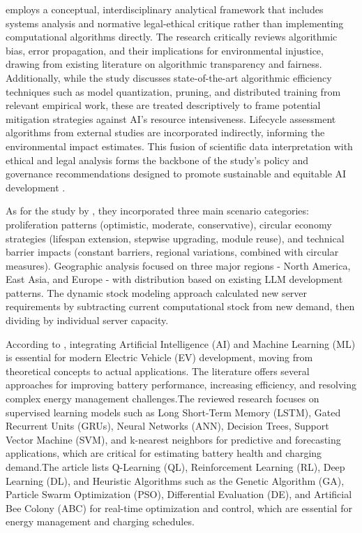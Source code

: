 \documentclass[a4paper, 12pt]{article}
\begin{document}
\par \citet{Zhuk2023} employs a conceptual, interdisciplinary analytical framework that includes systems analysis and normative legal-ethical critique rather than implementing computational algorithms directly. The research critically reviews algorithmic bias, error propagation, and their implications for environmental injustice, drawing from existing literature on algorithmic transparency and fairness. Additionally, while the study discusses state-of-the-art algorithmic efficiency techniques such as model quantization, pruning, and distributed training from relevant empirical work, these are treated descriptively to frame potential mitigation strategies against AI’s resource intensiveness. Lifecycle assessment algorithms from external studies are incorporated indirectly, informing the environmental impact estimates. This fusion of scientific data interpretation with ethical and legal analysis forms the backbone of the study’s policy and governance recommendations designed to promote sustainable and equitable AI development \citep[pp.~25--29]{Zhuk2023}. \hfill \break
\par As for the study by \cite{wang_2024_ewaste}, they incorporated three main scenario categories: proliferation patterns (optimistic, moderate, conservative), circular economy strategies (lifespan extension, stepwise upgrading, module reuse), and technical barrier impacts (constant barriers, regional variations, combined with circular measures). Geographic analysis focused on three major regions - North America, East Asia, and Europe - with distribution based on existing LLM development patterns. The dynamic stock modeling approach calculated new server requirements by subtracting current computational stock from new demand, then dividing by individual server capacity. \hfill \break
\par According to \citet{M.rauf2024}, integrating Artificial Intelligence (AI) and Machine Learning (ML) is essential for modern Electric Vehicle (EV) development, moving from theoretical concepts to actual applications.   The literature offers several approaches for improving battery performance, increasing efficiency, and resolving complex energy management challenges.The reviewed research focuses on supervised learning models such as Long Short-Term Memory (LSTM), Gated Recurrent Units (GRUs), Neural Networks (ANN), Decision Trees, Support Vector Machine (SVM), and k-nearest neighbors for predictive and forecasting applications, which are critical for estimating battery health and charging demand.The article lists Q-Learning (QL), Reinforcement Learning (RL), Deep Learning (DL), and Heuristic Algorithms such as the Genetic Algorithm (GA), Particle Swarm Optimization (PSO), Differential Evaluation (DE), and Artificial Bee Colony (ABC) for real-time optimization and control, which are essential for energy management and charging schedules.\hfill \break
\end{document}
